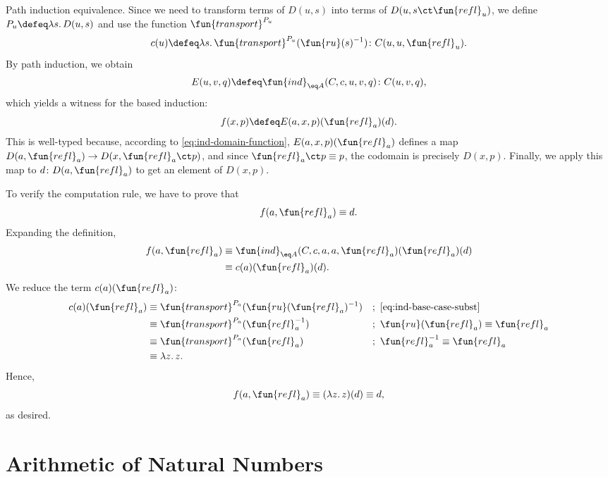 \begin{lpar}{Path induction equivalence.}
    Since we need to transform terms of $D(u,s)$ into terms of $D(u,s\ct\fun{refl}_u)$, we define $P_u\defeq\lambda s.\,D(u,s)$ and use the function $\fun{transport}^{P_u}$
    \begin{equation}\label{eq:ind-base-case-subst}
        c(u)\defeq\lambda s.\,\fun{transport}^{P_u}(\fun{ru}(s)^{-1})
            \colon C(u,u,\fun{refl}_u).
    \end{equation}
    By path induction, we obtain
    \[
        E(u,v,q) \defeq\fun{ind}_{\eq A}(C,c,u,v,q)\colon C(u,v,q),
    \]
    which yields a witness for the based induction:
    \[
        f(x,p)\defeq E(a,x,p)(\fun{refl}_a)(d).
    \]
    This is well-typed because, according to \eqref{eq:ind-domain-function}, $E(a,x,p)(\fun{refl}_a)$ defines a map  $D(a,\fun{refl}_a)\to D(x,\fun{refl}_a\ct p)$, and since  $\fun{refl}_a\ct p\equiv p$, the codomain is precisely  $D(x,p)$. Finally, we apply this map to $d\colon D(a,\fun{refl}_a)$ to get an element of $D(x,p)$.
    
    To verify the computation rule, we have to prove that
    \[
        f(a,\fun{refl}_a)\equiv d.
    \]
    Expanding the definition,
    \begin{align*}
        f(a,\fun{refl}_a)
            &\equiv\fun{ind}_{\eq A}(C,c,a,a,\fun{refl}_a)(\fun{refl}_a)(d)\\
            &\equiv c(a)(\fun{refl}_a)(d).
    \end{align*}
    We reduce the term  $c(a)(\fun{refl}_a)$:
    \begin{align*}
        c(a)(\fun{refl}_a)
            &\equiv\fun{transport}^{P_a}(\fun{ru}(\fun{refl}_a)^{-1})
                &&;\ \eqref{eq:ind-base-case-subst}\\
            &\equiv\fun{transport}^{P_a}(\fun{refl}_a^{-1})
                &&;\ \fun{ru}(\fun{refl}_a)\equiv\fun{refl}_a\\
            &\equiv\fun{transport}^{P_a}(\fun{refl}_a)
                &&;\ \fun{refl}_a^{-1}\equiv\fun{refl}_a\\
            &\equiv\lambda z.\,z.
    \end{align*}
    Hence,
    \[
        f(a,\fun{refl}_a)\equiv (\lambda z.\,z)(d) \equiv d,
    \]
    as desired.
\end{lpar}


\section{Arithmetic of Natural Numbers}

